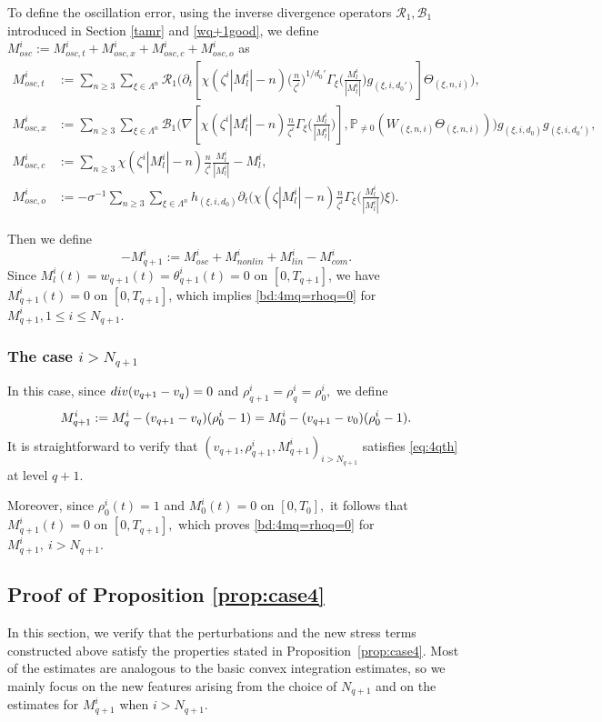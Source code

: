 \documentclass[10pt,a4paper]{amsart}
\numberwithin{equation}{section}
\def\({{\Big(}}
\def\){{\Big)}}
\def\geq{\geqslant}
\def\leq{\leqslant}
\def\div{\mathord{{\rm div}}}
\def\({{\Big(}}
\def\){{\Big)}}
\def\geq{\geqslant}
\def\leq{\leqslant}
\def\div{\mathord{{\rm div}}}
\begin{document}
 To define the oscillation error,   using the inverse divergence operators  $\mathcal{R}_1,\mathcal{B}_1$ introduced in Section \ref{tamr} and  \eqref{wq+1good}, we   define $M^{i}_{osc}:=M^{i}_{osc,t}+M^{i}_{osc,x}+M^{i}_{osc,c}+M^{i}_{osc,o}$ as
\begin{align*}
   M^{i}_{osc,t}&:=\sum_{n\geq3}\sum_{\xi\in\Lambda^{n}}\mathcal{R}_{1}\(\partial_t[\chi(\zeta^{i}|M^{i}_l|-n)\(\frac{n}{\zeta^{i}}\)^{1/d_0'}\Gamma_{\xi}\(\frac{M^{i}_l}{|M^{i}_l|}\)g_{(\xi,i,d_0')}]\Theta_{(\xi,n,i)}\),\\
M^{i}_{osc,x}&:=\sum_{n\geq3}\sum_{\xi\in\Lambda^{n}}\mathcal{B}_{1}\(\nabla[\chi(\zeta^{i}|M^{i}_l|-n)\frac{n}{\zeta^{i}}\Gamma_{\xi}\(\frac{M^{i}_l}{|M^{i}_l|}\)],\mathbb{P}_{\neq0}(W_{(\xi,n,i)}\Theta_{(\xi,n,i)})\)g_{(\xi,i,d_0)}g_{(\xi,i,d_0')},\\
   M^{i}_{osc,c}&:=\sum_{n\geq3}\chi(\zeta^{i}|M^{i}_l|-n)\frac{n}{\zeta^{i}}\frac{M^{i}_l}{|M^{i}_l|}- M^{i}_l,\\
    M^{i}_{osc,o}&:=-\sigma^{-1}\sum_{n\geq3}\sum_{\xi\in\Lambda^{n}}h_{(\xi,i,d_0)}\partial_t\(\chi(\zeta|M_l^i|-n)\frac{n}{\zeta^i}\Gamma_{\xi}\(\frac{M_l^i}{|M_l^i|}\)\xi\).%
\end{align*}
 
Then we define 
$$-{M}^i_{q+1}:=M^{i}_{osc}+M^{i}_{nonlin}+M^{i}_{lin}-M_{com}^i.$$
Since $M^{i}_l(t)=w_{q+1}(t)=\theta^i_{q+1}(t)=0$ on $[0,T_{q+1}]$,  we have $M_{q+1}^i(t)=0$ on $[0,T_{q+1}]$, which implies  \eqref{bd:4mq=rhoq=0} for $M_{q+1}^i,1\leq i\leq N_{q+1}$. 

\subsubsection{The case $i>N_{q+1}$}
In this case, since
$
\div(v_{q+1}-v_q)=0
$
and
$
\rho_{q+1}^i=\rho_q^i=\rho_0^i,
$
we   define
\begin{align}
M_{q+1}^i
:=
M_q^i-(v_{q+1}-v_q)(\rho_0^i-1)
=
M_0^i-(v_{q+1}-v_0)(\rho_0^i-1).
\notag
\end{align}
It is straightforward to verify that
$
(v_{q+1},\rho_{q+1}^i,M_{q+1}^i)_{i>N_{q+1}}
$
satisfies \eqref{eq:4qth} at level $q+1$.

Moreover, since
$
\rho_0^i(t)=1
$
and
$
M_0^i(t)=0
$
on
$
[0,T_0],
$
it follows that
$
M_{q+1}^i(t)=0
$
on
$
[0,T_{q+1}],
$
which proves \eqref{bd:4mq=rhoq=0} for
$
M_{q+1}^i,
\ 
i>N_{q+1}.
$  



\subsection{Proof of Proposition \ref{prop:case4}}  In this section, we verify that the perturbations and the new stress terms constructed above satisfy the properties stated in Proposition~\ref{prop:case4}. 
Most of the estimates are analogous to the basic convex integration estimates, so we mainly focus on the new features arising from the choice of $N_{q+1}$ and on the estimates for $M_{q+1}^i$ when $i>N_{q+1}$.
\end{document}
